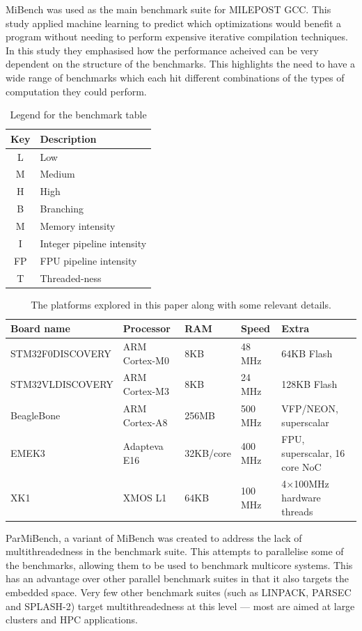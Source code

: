 \documentclass[twocolumn]{article}
\begin{document}
MiBench was used as the main benchmark suite for MILEPOST GCC\cite{Fursin2011}. This study applied machine learning to predict which optimizations would benefit a program without needing to perform expensive iterative compilation techniques. In this study they emphasised how the performance acheived can be very dependent on the structure of the benchmarks. This highlights the need to have a wide range of benchmarks which each hit different combinations of the types of computation they could perform.

\begin{table}[t]
\centering
	\begin{tabular}{c l}
		Key & Description \\
		\hline
		L	&	Low \\
		M	&	Medium \\
		H	&	High \\
		\hline
		B	&	Branching \\
		M	&	Memory intensity \\
		I	&	Integer pipeline intensity \\
		FP	&	FPU pipeline intensity \\
		T	&	Threaded-ness \\
	\end{tabular}
	\caption{Legend for the benchmark table}
	\label{BenchmarkLegend}
\end{table}


\begin{table}[!hbt]
	\centering
	\begin{tabular}{l l l l l}
		\textbf{Board name} & \textbf{Processor} & \textbf{RAM} & \textbf{Speed} & \textbf{Extra} \\
		\hline
		STM32F0DISCOVERY	& ARM Cortex-M0 		& 8KB		& 48 MHz		  & 64KB Flash\\
		STM32VLDISCOVERY	& ARM Cortex-M3 		& 8KB		& 24 MHz		  & 128KB Flash\\
		BeagleBone			& ARM Cortex-A8 		& 256MB		& 500 MHz		  & VFP/NEON, superscalar\\
		EMEK3				& Adapteva E16 			& 32KB/core & 400 MHz		  & FPU, superscalar, 16 core NoC\\
		XK1					& XMOS L1 				& 64KB		& 100 MHz 		& 4$\times$100MHz hardware threads \\
	\end{tabular}
	\caption{The platforms explored in this paper along with some relevant details.}
	\label{Table:Platforms}
\end{table}
ParMiBench, a variant of MiBench was created to address the lack of multithreadedness in the benchmark suite. This attempts to parallelise some of the benchmarks, allowing them to be used to benchmark multicore systems. This has an advantage over other parallel benchmark suites in that it also targets the embedded space. Very few other benchmark suites (such as LINPACK, PARSEC and SPLASH-2\cite{Bienia2008}) target multithreadedness at this level --- most are aimed at large clusters and HPC applications.
\end{document}
